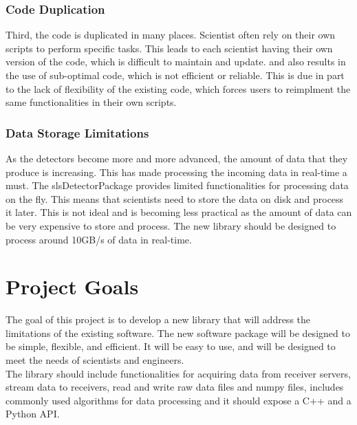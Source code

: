 \begin{spacing}{1.2}
    \subsubsection{Code Duplication}
    Third, the code is duplicated in many places. Scientist often rely on their own scripts to
    perform specific tasks.    This leads to each scientist having their own version of the
    code, which is difficult to maintain and update.    and also results in the use of
    sub-optimal code, which is not efficient or reliable. This is due in part to the lack of
    flexibility of the existing code, which forces users to reimplment the same functionalities
    in their own scripts.


    \subsubsection{Data Storage Limitations}
    As the detectors become more and more advanced, the amount of data that they produce is increasing.
    This has made processing the incoming data in real-time a must. The slsDetectorPackage provides limited
    functionalities for processing data on the fly. This means that scientists need to store the data on disk
    and process it later. This is not ideal and is becoming less practical as the amount of data can be very expensive to
    store and process. The new library should be designed to process around 10GB/s of data in real-time.



    \section{Project Goals}
    The goal of this project is to develop a new library that will address the limitations of the existing software.
    The new software package will be designed to be simple, flexible, and efficient. It will be easy to use, and will be
    designed to meet the needs of scientists and engineers. \\

    The library should include functionalities for acquiring data from receiver servers, stream data to receivers,
    read and write raw data files and numpy files, includes commonly used algorithms for data processing and it should
    expose a C++ and a Python API. \\


\end{spacing}
